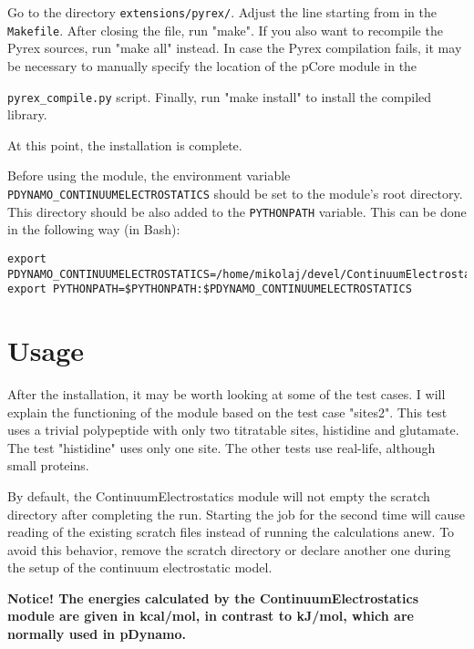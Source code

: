 \documentclass[a4paper,11pt]{article}
\newcommand{\modulename}{ContinuumElectrostatics\xspace}
\begin{document}
\bigskip
Go to the directory \texttt{extensions/pyrex/}.
%
Adjust the line starting from  in the \texttt{Makefile}.
%
After closing the file, run "make".
%
If you also want to recompile the Pyrex sources, run "make all" instead.
%
In case the Pyrex compilation fails, it may be necessary to manually specify the location of the pCore module in the {\texttt{pyrex\_compile.py} script.
%
Finally, run "make install" to install the compiled library.

\bigskip
At this point, the installation is complete.

\bigskip
Before using the module, the environment variable \texttt{PDYNAMO\_CONTINUUMELECTROSTATICS} 
should be set to the module's root directory.
%
This directory should be also added to the \texttt{PYTHONPATH} variable. 
%
This can be done in the following way (in Bash):

\newpage
{\footnotesize \begin{lstlisting}
export PDYNAMO_CONTINUUMELECTROSTATICS=/home/mikolaj/devel/ContinuumElectrostatics
export PYTHONPATH=$PYTHONPATH:$PDYNAMO_CONTINUUMELECTROSTATICS
\end{lstlisting} }


\section{Usage}
After the installation, it may be worth looking at some of the test cases.
%
I will explain the functioning of the module based on the test case "sites2".
%
This test uses a trivial polypeptide with only two titratable sites,
histidine and glutamate.
%
The test "histidine" uses only one site. The other tests use real-life,
although small proteins.


By default, the \modulename module will not empty the scratch directory
after completing the run.
%
Starting the job for the second time will cause reading of the existing 
scratch files instead of running the calculations anew.
%
To avoid this behavior, remove the scratch directory or declare another one
during the setup of the continuum electrostatic model.

\textbf{Notice! The energies calculated by the \modulename module are 
given in kcal/mol, in contrast to kJ/mol, which are normally used 
in pDynamo.}


}
\end{document}
